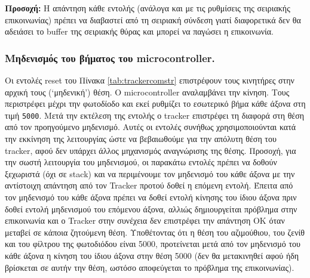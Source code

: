 \documentclass[
  a4paper,
  twoside,
  titlepage,
  11pt]{article}
\numberwithin{equation}{section}
\numberwithin{figure}{section}
\numberwithin{table}{section}
\begin{document}
\textbf{Προσοχή:} Η απάντηση κάθε εντολής (ανάλογα και με τις ρυθμίσεις της σειριακής
επικοινωνίας) πρέπει να διαβαστεί από τη σειριακή σύνδεση γιατί διαφορετικά δεν θα
αδειάσει το buffer της σειριακής θύρας και μπορεί να παγώσει η επικοινωνία.

\hypertarget{ux3bcux3b7ux3b4ux3b5ux3bdux3b9ux3c3ux3bcux3ccux3c2-ux3c4ux3bfux3c5-ux3b2ux3aeux3bcux3b1ux3c4ux3bfux3c2-ux3c4ux3bfux3c5-microcontroller.}{%
\subsubsection{Μηδενισμός του βήματος του microcontroller.}\label{ux3bcux3b7ux3b4ux3b5ux3bdux3b9ux3c3ux3bcux3ccux3c2-ux3c4ux3bfux3c5-ux3b2ux3aeux3bcux3b1ux3c4ux3bfux3c2-ux3c4ux3bfux3c5-microcontroller.}}

Οι εντολές reset του Πίνακα \ref{tab:trackercomstr} επιστρέφουν τους κινητήρες στην
αρχική τους (`μηδενική') θέση. Ο microcontroller αναλαμβάνει την κίνηση. Τους
περιστρέφει μέχρι την φωτοδίοδο και εκεί ρυθμίζει το εσωτερικό βήμα κάθε άξονα στη
τιμή \texttt{5000}. Μετά την εκτέλεση της εντολής ο tracker επιστρέφει τη διαφορά στη θέση
από τον προηγούμενο μηδενισμό. Αυτές οι εντολές συνήθως χρησιμοποιούνται κατά την
εκκίνηση της λειτουργίας ώστε να βεβαιωθούμε για την απόλυτη θέση του tracker, αφού
δεν υπάρχει άλλος μηχανισμός αναγνώρισης της θέσης. Προσοχή, για την σωστή
λειτουργία του μηδενισμού, οι παρακάτω εντολές πρέπει να δοθούν ξεχωριστά (όχι σε
stack) και να περιμένουμε τον μηδενισμό του κάθε άξονα με την αντίστοιχη απάντηση από
τον Tracker προτού δοθεί η επόμενη εντολή. Έπειτα από τον μηδενισμό του κάθε άξονα
πρέπει να δοθεί εντολή κίνησης του ίδιου άξονα πριν δοθεί εντολή μηδενισμού του
επόμενου άξονα, αλλιώς δημιουργείται πρόβλημα στην επικοινωνία και ο Tracker στην
συνέχεια δεν επιστρέφει την απάντηση OK όταν μεταβεί σε κάποια ζητούμενη θέση.
Υποθέτοντας ότι η θέση του αζιμούθιου, του ζενίθ και του φίλτρου της φωτοδιόδου είναι
5000, προτείνεται μετά από τον μηδενισμό του κάθε άξονα η κίνηση του ίδιου άξονα στην
θέση 5000 (δεν θα μετακινηθεί αφού ήδη βρίσκεται σε αυτήν την θέση, ωστόσο
αποφεύγεται το πρόβλημα της επικοινωνίας).

\footnotesize
\end{document}
